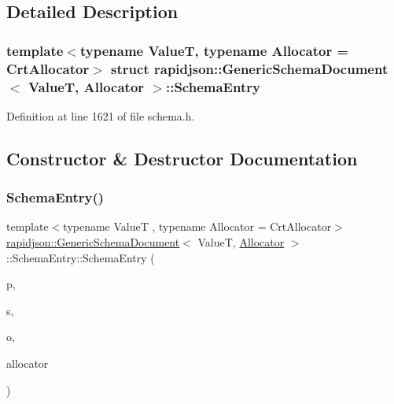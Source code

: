 \subsection{Detailed Description}
\subsubsection*{template$<$typename ValueT, typename Allocator = Crt\+Allocator$>$\newline
struct rapidjson\+::\+Generic\+Schema\+Document$<$ Value\+T, Allocator $>$\+::\+Schema\+Entry}



Definition at line 1621 of file schema.\+h.



\subsection{Constructor \& Destructor Documentation}
\mbox{\label{structrapidjson_1_1_generic_schema_document_1_1_schema_entry_a97de9b1666b612f7aa33fe8d2848d199}} 
\subsubsection{\texorpdfstring{SchemaEntry()}{SchemaEntry()}}
{\footnotesize\ttfamily template$<$typename ValueT , typename Allocator  = Crt\+Allocator$>$ \\
\mbox{\hyperlink{classrapidjson_1_1_generic_schema_document}{rapidjson\+::\+Generic\+Schema\+Document}}$<$ ValueT, \mbox{\hyperlink{classrapidjson_1_1_allocator}{Allocator}} $>$\+::Schema\+Entry\+::\+Schema\+Entry (\begin{DoxyParamCaption}\item[{const \mbox{\hyperlink{classrapidjson_1_1_generic_schema_document_a61540c0f8aa542760ae03257a0e6dab7}{Pointer\+Type}} \&}]{p,  }\item[{\mbox{\hyperlink{classrapidjson_1_1_generic_schema_document_aaf4e7f371de938025f7ed4be3b83266e}{Schema\+Type}} $\ast$}]{s,  }\item[{bool}]{o,  }\item[{\mbox{\hyperlink{classrapidjson_1_1_allocator}{Allocator}} $\ast$}]{allocator }\end{DoxyParamCaption})}



